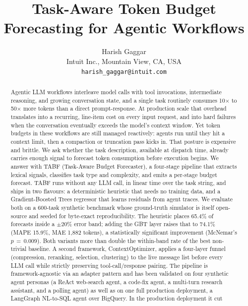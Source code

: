 \documentclass{article}
\title{Task-Aware Token Budget Forecasting for Agentic Workflows}
\author{%
  Harish Gaggar \\
  Intuit Inc., Mountain View, CA, USA \\
  \texttt{harish\_gaggar@intuit.com}
}
\begin{document}
\raggedbottom

\maketitle

\begin{abstract}
Agentic LLM workflows interleave model calls with tool invocations,
intermediate reasoning, and growing conversation state, and a single
task routinely consumes 10$\times$ to 50$\times$ more tokens than a
direct prompt-response. At production scale that overhead translates
into a recurring, line-item cost on every input request, and into
hard failures when the conversation eventually exceeds the model's
context window. Yet token budgets in these workflows are still
managed reactively: agents run until they hit a context limit, then
a compaction or truncation pass kicks in. That posture is expensive
and brittle. We ask whether the task description, available at
dispatch time, already carries enough signal to forecast token
consumption before execution begins. We answer with TABF
(Task-Aware Budget Forecaster), a four-stage pipeline that extracts lexical
signals, classifies task type and complexity, and emits a per-stage budget
forecast. TABF runs without any LLM call, in linear time over the task
string, and ships in two flavours: a deterministic heuristic that needs no
training data, and a Gradient-Boosted Trees regressor that learns residuals
from agent traces. We evaluate both on a 600-task synthetic benchmark whose
ground-truth simulator is itself open-source and seeded for byte-exact
reproducibility. The heuristic places 65.4\% of forecasts inside a
$\pm$20\% error band; adding the GBT layer raises that to 74.1\% (MAPE
15.9\%, MAE 1{,}882 tokens), a statistically significant improvement
(McNemar's $p\,{=}\,0.009$). Both variants more than double the
within-band rate of the best non-trivial baseline.
A second framework, ContextOptimizer, applies a
four-layer funnel (compression, reranking, selection, clustering)
to the live message list before every LLM call while strictly
preserving tool-call/response pairing. The pipeline is
framework-agnostic via an adapter pattern and has been validated
on four synthetic agent personas (a ReAct web-search agent, a
code-fix agent, a multi-turn research assistant, and a polling
agent) as well as on one full production deployment, a LangGraph
NL-to-SQL agent over BigQuery. In the production deployment it cut

\end{abstract}
\end{document}
